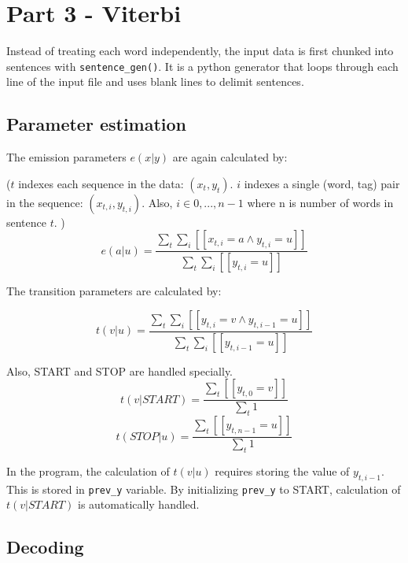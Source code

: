 \documentclass[12pt]{article}
\begin{document}
\pagebreak

\section{Part 3 - Viterbi}

Instead of treating each word independently, the input data is first chunked into sentences with \verb|sentence_gen()|. It is a python generator that loops through each line of the input file and uses blank lines to delimit sentences.

\subsection{Parameter estimation}

The emission parameters \(e(x|y)\) are again calculated by:

(\(t\) indexes each sequence in the data: \((x_t, y_t)\). \(i\) indexes a single (word, tag) pair in the sequence: \((x_{t,i}, y_{t,i})\). Also, \(i \in {0,...,n-1}\) where n is number of words in sentence \(t\). )
\[ e(a|u) = \frac{\sum_t \sum_i [[x_{t,i}=a \land y_{t,i}=u]] }{\sum_{t} \sum_i [[y_{t,i}=u]] } \]

The transition parameters are calculated by:

\[ t(v|u) = \frac{\sum_t \sum_i [[y_{t,i}=v \land y_{t,i-1}=u]] }{\sum_{t} \sum_i [[y_{t,i-1}=u]] } \]

Also, START and STOP are handled specially.
\[ t(v|START) = \frac{\sum_t [[y_{t,0}=v]] }{\sum_{t} 1 } \]
\[ t(STOP|u) = \frac{\sum_t [[y_{t,n-1}=u]] }{\sum_{t} 1 } \]

In the program, the calculation of \(t(v|u)\) requires storing the value of \(y_{t,i-1}\). This is stored in \verb|prev_y| variable. By initializing \verb|prev_y| to START, calculation of \(t(v|START)\) is automatically handled.

\subsection{Decoding}
\end{document}
